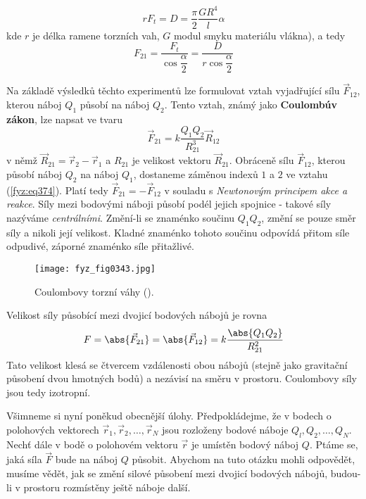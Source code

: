     \begin{equation}\label{fyz:eq372}
      rF_t = D = \frac{\pi}{2}\frac{GR^4}{l}\alpha
    \end{equation}
    kde \(r\) je délka ramene torzních vah, \(G\) modul smyku materiálu vlákna), a tedy
    \begin{equation}\label{fyz:eq373}
      F_{21} = \dfrac{F_t}{\cos\dfrac{\alpha}{2}} = \dfrac{D}{r\cos\dfrac{\alpha}{2}}
    \end{equation}
    
    Na základě výsledků těchto experimentů lze formulovat vztah vyjadřující sílu \(\vec{F}_{12}\),
    kterou náboj \(Q_1\) působí na náboj \(Q_2\). Tento vztah, známý jako \textbf{Coulombúv zákon},
    lze napsat ve tvaru
    \begin{equation}\label{fyz:eq374}
      \vec{F}_{21} = k\frac{Q_1Q_2}{R_{21}^3}\vec{R}_{12}
    \end{equation}
    v němž \(\vec{R}_{21} = \vec{r}_2 - \vec{r}_1\) a \(R_{21}\) je velikost vektoru
    \(\vec{R}_{21}\). Obráceně sílu \(\vec{F}_{12}\), kterou působí náboj \(Q_2\) na náboj \(Q_1\),
    dostaneme záměnou indexů \(1\) a \(2\) ve vztahu (\ref{fyz:eq374}). Platí tedy \(\vec{F}_{21} =
    -\vec{F}_{12}\) v souladu s \emph{Newtonovým principem akce a reakce}. Síly mezi bodovými náboji
    působí podél jejich spojnice - takové síly nazýváme \emph{centrálními}. Změní-li se znaménko
    součinu \(Q_1Q_2\), změní se pouze směr síly a nikoli její velikost. Kladné znaménko tohoto
    součinu odpovídá přitom síle odpudivé, záporné znaménko síle přitažlivé. 
      
    \begin{figure}[ht!]  %
      \centering
      \texttt{[image: fyz\_fig0343.jpg]}
      \caption{Coulombovy torzní váhy (\cite[s.~294]{Feynman02}).}
      \label{fyz:fig0343}
    \end{figure}
    
    Velikost síly působící mezi dvojicí bodových nábojů je rovna
    \begin{equation}\label{fyz:eq375}
      F = \abs{\vec{F}_{21}} = \abs{\vec{F}_{12}} = k\frac{\abs{Q_1Q_2}}{R_{21}^2}
    \end{equation}
    Tato velikost klesá se čtvercem vzdálenosti obou nábojů (stejně jako gravitační působení dvou
    hmotných bodů) a nezávisí na směru v prostoru. Coulombovy síly jsou tedy izotropní.
    
    Všimneme si nyní poněkud obecnější úlohy. Předpokládejme, že v bodech o polohových vektorech
    \(\vec{r}_1, \vec{r}_2, \ldots, \vec{r}_N\) jsou rozloženy bodové náboje \(Q_l, Q_2, \ldots,
    Q_N\). Nechť dále v bodě o polohovém vektoru \(\vec{r}\) je umístěn bodový náboj \(Q\). Ptáme
    se, jaká síla \(\vec{F}\) bude na náboj \(Q\) působit. Abychom na tuto otázku mohli odpovědět,
    musíme vědět, jak se změní silové působení mezi dvojicí bodových nábojů, budou-li v prostoru
    rozmístěny ještě náboje další. 
    
